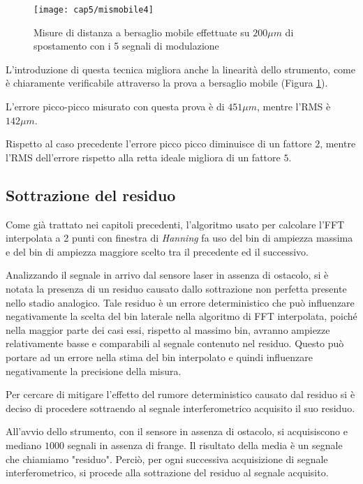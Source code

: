 \begin{figure}  
  \begin{center}
    \texttt{[image: cap5/mismobile4]}
    \caption{Misure di distanza a bersaglio mobile effettuate su $200\mu m$ di spostamento con i 5 segnali di modulazione}
    \label{mismobile4}
  \end{center}
\end{figure}

L'introduzione di questa tecnica migliora anche la linearità dello strumento, come è chiaramente verificabile attraverso la prova a bersaglio mobile (Figura \ref{mismobile4}).

L'errore picco-picco misurato con questa prova è di $451 \mu m$, mentre l'RMS è $142 \mu m$.

Rispetto al caso precedente l'errore picco picco diminuisce di un fattore $2$, mentre l'RMS dell'errore rispetto alla retta ideale migliora di un fattore $5$.

\subsection{Sottrazione del residuo}
Come già trattato nei capitoli precedenti, l'algoritmo usato per calcolare l'FFT interpolata a 2 punti con finestra di \textit{Hanning} fa uso del bin di ampiezza massima e del bin di ampiezza maggiore scelto tra il precedente ed il successivo.

Analizzando il segnale in arrivo dal sensore laser in assenza di ostacolo, si è notata la presenza di un residuo causato dallo sottrazione non perfetta presente nello stadio analogico. Tale residuo è un errore deterministico che può influenzare negativamente la scelta del bin laterale nella algoritmo di FFT interpolata, poiché nella maggior parte dei casi essi, rispetto al massimo bin, avranno ampiezze relativamente basse e comparabili al segnale contenuto nel residuo. Questo può portare ad un errore nella stima del bin interpolato e quindi influenzare negativamente la precisione della misura.

Per cercare di mitigare l'effetto del rumore deterministico causato dal residuo si è deciso di procedere sottraendo al segnale interferometrico acquisito il suo residuo.

All'avvio dello strumento, con il sensore in assenza di ostacolo, si acquisiscono e mediano $1000$ segnali in assenza di frange. Il risultato della media è un segnale che chiamiamo "residuo". Perciò, per ogni successiva acquisizione di segnale interferometrico, si procede alla sottrazione del residuo al segnale acquisito.

